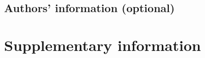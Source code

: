 \documentclass[review,
3p]{elsarticle} %
\begin{document}
\hypertarget{authors-information-optional}{%
\subsection{Authors' information
(optional)}\label{authors-information-optional}}

\hypertarget{supplementary-information}{%
\section{Supplementary information}\label{supplementary-information}}

\renewcommand\refname{References}

\end{document}
